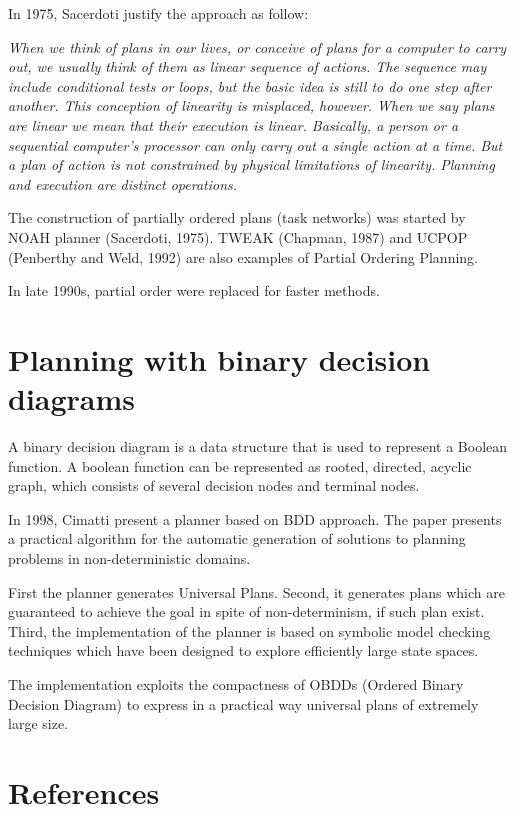 \documentclass[10pt, a4paper,english]{article}
\begin{document}
In 1975, Sacerdoti justify the approach as follow:

\bigskip

\indent \textit{When we think of plans in our lives, or conceive of plans for a computer to carry out, we usually think of them as linear sequence of actions. The sequence may include conditional tests or loops, but the basic idea is still to do one step after another. 
This conception of linearity is misplaced, however. When we say plans are linear we mean that their execution is linear. Basically, a person or a sequential computer's processor can only carry out a single action at a time. But a plan of action is not constrained by physical limitations of linearity. Planning and execution are distinct operations.  
}

\bigskip

The construction of partially ordered plans (task networks) was started by NOAH planner (Sacerdoti, 1975). TWEAK (Chapman, 1987) and UCPOP (Penberthy and Weld, 1992) are also examples of Partial Ordering Planning.

In late 1990s, partial order were replaced for faster methods.

\section{Planning with binary decision diagrams}

A binary decision diagram is a data structure that is used to represent a Boolean function. A boolean function can be represented as rooted, directed, acyclic graph, which consists of several decision nodes and terminal nodes. 

In 1998, Cimatti present a planner based on BDD approach. The paper presents a practical algorithm for the automatic generation of solutions to planning problems in non-deterministic domains. 

First the planner generates Universal Plans. Second, it generates plans which are guaranteed to achieve the goal in spite of non-determinism, if such plan exist. Third, the implementation of the planner is based on symbolic model checking techniques which have been designed to explore efficiently large state spaces. 

The implementation exploits the compactness of OBDDs (Ordered Binary Decision Diagram) to express in a practical way universal plans of extremely large size.

\newpage
\section{References}
\end{document}
